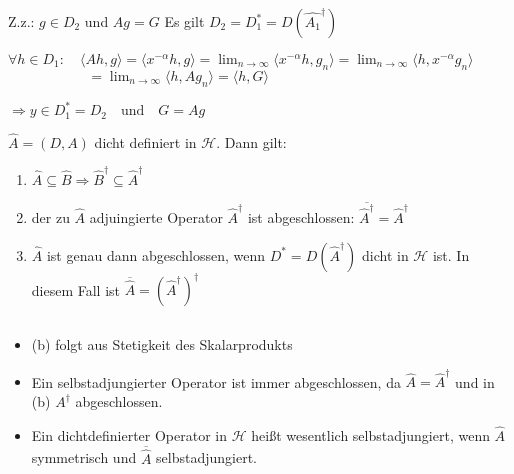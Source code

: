 \begin{Bsp}
\begin{addmargin}[25pt]{0pt}
        Z.z.: $g \in D_2$ und $Ag=G$ Es gilt $D_2 = D_1^\ast = D(\hat{A_1}^ \dagger)$

        $\forall h \in D_1: \quad \langle Ah, g \rangle = \langle x^{-\alpha} h, g \rangle =
        \lim_{n \rightarrow \infty} \langle x^{-\alpha} h, g_n \rangle =
        \lim_{n \rightarrow \infty} \langle h, x^{-\alpha} g_n \rangle$\\ 
        $\textrm{ } \qquad \qquad \quad = \lim_{n \rightarrow \infty} \langle h, A g_n \rangle =
        \langle h , G \rangle$

        $\Rightarrow y \in D_1^\ast = D_2 \quad \textrm{und} \quad G = Ag$
    \end{addmargin}
\end{Bsp}

\begin{Satz}
    $\hat{A} = (D,A)$ dicht definiert in $\mathcal{H}$. Dann gilt:
    \begin{enumerate}[label=(\alph*)]
        \item $\hat{A} \subseteq \hat{B} \Rightarrow \hat{B}^\dagger \subseteq \hat{A}^\dagger$
        \item der zu $\hat{A}$ adjuingierte Operator  $\hat{A}^\dagger$ ist abgeschlossen:
                $\overline{\hat{A}^\dagger} = \hat{A}^\dagger$
        \item $\hat{A}$ ist genau dann abgeschlossen, wenn $D^\ast = D(\hat{A}^\dagger)$ dicht in
                $\mathcal{H}$ ist. In diesem Fall ist $\overline{\hat{A}} =
                \left(\hat{A}^\dagger\right)^\dagger$
    \end{enumerate}
\end{Satz}

\begin{Bem}{$\textrm{ }$ \newline} %
    \begin{itemize}
        \item (b) folgt aus Stetigkeit des Skalarprodukts
        \item Ein selbstadjungierter Operator ist immer abgeschlossen, da $\hat{A} = \hat{A}^\dagger$ und
                in (b)  $A^\dagger$ abgeschlossen.
        \item Ein dichtdefinierter Operator in $\mathcal{H}$ heißt wesentlich selbstadjungiert, wenn 
                $\hat{A}$ symmetrisch und $\overline{\hat{A}}$ selbstadjungiert.
    \end{itemize}
\end{Bem}

